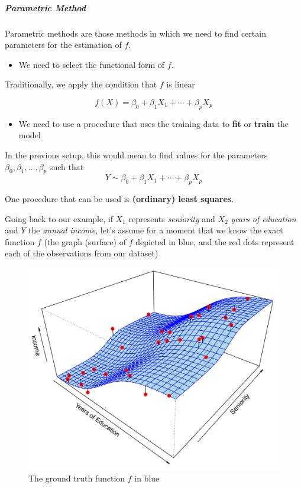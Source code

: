 \documentclass[11pt]{article}
\makeatletter
\def\maxwidth{\ifdim\Gin@nat@width>\linewidth\linewidth
    \else\Gin@nat@width\fi}
\let\Oldincludegraphics\includegraphics
\renewcommand{\includegraphics}[1]{\Oldincludegraphics[width=.8\maxwidth]{#1}}
\providecommand{\tightlist}{%
      \setlength{\itemsep}{0pt}\setlength{\parskip}{0pt}}
\makeatother
\begin{document}
\hypertarget{parametric-method}{%
\subparagraph{Parametric Method}\label{parametric-method}}

Parametric methods are those methods in which we need to find certain
parameters for the estimation of \(f\).

\begin{itemize}
\tightlist
\item
  We need to select the functional form of \(f\).
\end{itemize}

Traditionally, we apply the condition that \(f\) is linear

\begin{equation}
f(X) = \beta_0+ \beta_1 X_1 + \cdots+ \beta_p X_p
\end{equation}

\begin{itemize}
\tightlist
\item
  We need to use a procedure that uses the training data to \textbf{fit}
  or \textbf{train} the model
\end{itemize}

In the previous setup, this would mean to find values for the parameters
\(\beta_0, \beta_1,\ldots,\beta_p\) such that \begin{equation*}
Y \sim \beta_0+ \beta_1 X_1 + \cdots+ \beta_p X_p
\end{equation*}

One procedure that can be used is \textbf{(ordinary) least squares}.

    Going back to our example, if \(X_1\) represents \emph{seniority} and
\(X_2\) \emph{years of education} and \(Y\) the \emph{annual income},
let's assume for a moment that we know the exact function \(f\) (the
graph (surface) of \(f\) depicted in blue, and the red dots represent
each of the observations from our dataset)

\begin{figure}[h!]
    \centering
    \includegraphics{2.3.png}
    \caption{The ground truth function $f$ in blue}
\end{figure}
\end{document}
